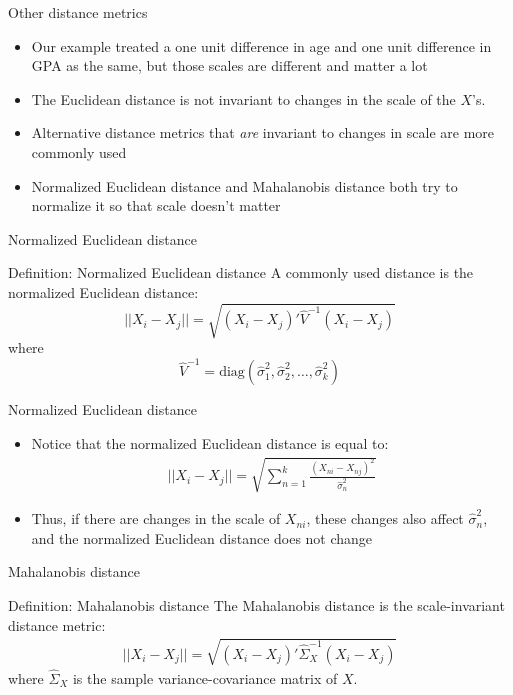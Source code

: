 \documentclass{beamer}
\begin{document}
\begin{frame}{Other distance metrics}

\begin{itemize}
\item Our example treated a one unit difference in age and one unit difference in GPA as the same, but those scales are different and matter a lot
\item The Euclidean distance is not invariant to changes in the scale of the $X$'s.  
\item Alternative distance metrics that \emph{are} invariant to changes in scale are more commonly used 
\item Normalized Euclidean distance and Mahalanobis distance both try to normalize it so that scale doesn't matter
\end{itemize}

\end{frame}


\begin{frame}{Normalized Euclidean distance}

	\begin{block}{Definition: Normalized Euclidean distance}
	  A commonly used distance is the normalized Euclidean distance:$$||X_i-X_j|| = \sqrt{ (X_i-X_j)'\widehat{V}^{-1}(X_i - X_j) }$$ where
		$$\widehat{V}^{-1} = \text{diag}(\widehat{\sigma}_1^2, \widehat{\sigma}_2^2, \dots, \widehat{\sigma}_k^2)$$
	\end{block}
\end{frame}

\begin{frame}{Normalized Euclidean distance}
	\begin{itemize}
	\item Notice that the normalized Euclidean distance is equal to:
		\begin{eqnarray*}
		||X_i - X_j|| = \sqrt{\sum_{n=1}^k \frac{(X_{ni} - X_{nj})^2}{\widehat{\sigma}^2_n}}
		\end{eqnarray*}
	\item Thus, if there are changes in the scale of $X_{ni}$, these changes also affect $\widehat{\sigma}^2_n$, and the normalized Euclidean distance does not change
	\end{itemize}

\end{frame}


\begin{frame}{Mahalanobis distance}
	
	\begin{block}{Definition: Mahalanobis distance}
	The Mahalanobis distance is the scale-invariant distance metric:
		\begin{eqnarray*}
		||X_i-X_j|| = \sqrt{ (X_i-X_j)'\widehat{\Sigma}_X^{-1}(X_i - X_j) }
		\end{eqnarray*}
	where $\widehat{\Sigma}_X$ is the sample variance-covariance matrix of $X$.
	\end{block}


\end{frame}
\end{document}
